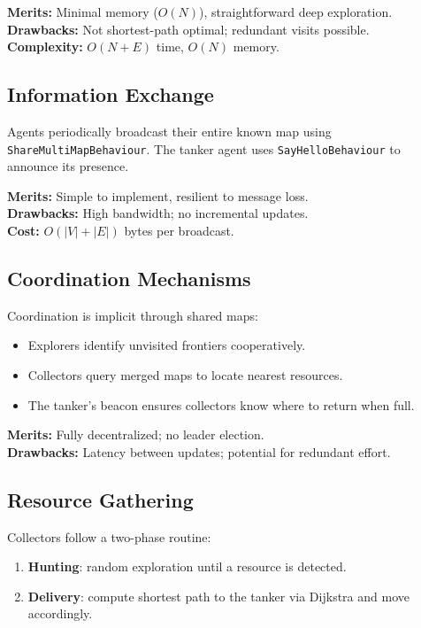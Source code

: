 \documentclass[a4paper,11pt]{article}
\begin{document}
\textbf{Merits:} Minimal memory ($O(N)$), straightforward deep exploration.\\
\textbf{Drawbacks:} Not shortest-path optimal; redundant visits possible.\\
\textbf{Complexity:} $O(N+E)$ time, $O(N)$ memory.

\subsection{Information Exchange}
Agents periodically broadcast their entire known map using \texttt{ShareMultiMapBehaviour}. The tanker agent uses \texttt{SayHelloBehaviour} to announce its presence.

\textbf{Merits:} Simple to implement, resilient to message loss.\\
\textbf{Drawbacks:} High bandwidth; no incremental updates.\\
\textbf{Cost:} $O(|V|+|E|)$ bytes per broadcast.

\subsection{Coordination Mechanisms}
Coordination is implicit through shared maps:
\begin{itemize}
  \item Explorers identify unvisited frontiers cooperatively.
  \item Collectors query merged maps to locate nearest resources.
  \item The tanker’s beacon ensures collectors know where to return when full.
\end{itemize}

\textbf{Merits:} Fully decentralized; no leader election.\\
\textbf{Drawbacks:} Latency between updates; potential for redundant effort.

\subsection{Resource Gathering}
Collectors follow a two-phase routine:
\begin{enumerate}
  \item \textbf{Hunting}: random exploration until a resource is detected.
  \item \textbf{Delivery}: compute shortest path to the tanker via Dijkstra and move accordingly.
\end{enumerate}
\end{document}
